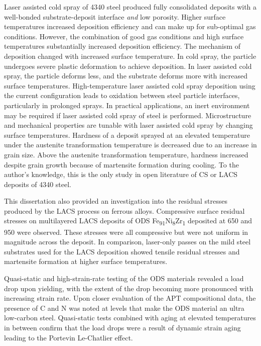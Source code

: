 		Laser assisted cold spray of 4340 steel produced fully consolidated deposits with a well-bonded substrate-deposit interface \textit{and} low porosity. Higher surface temperatures increased deposition efficiency and can make up for sub-optimal gas conditions. However, the combination of good gas conditions and high surface temperatures substantially increased deposition efficiency. The mechanism of deposition changed with increased surface temperature. In cold spray, the particle undergoes severe plastic deformation to achieve deposition. In laser assisted cold spray, the particle deforms less, and the substrate deforms more with increased surface temperatures. High-temperature laser assisted cold spray deposition using the current configuration leads to oxidation between steel particle interfaces, particularly in prolonged sprays. In practical applications, an inert environment may be required if laser assisted cold spray of steel is performed. Microstructure and mechanical properties are tunable with laser assisted cold spray by changing surface temperatures. Hardness of a deposit sprayed at an elevated temperature under the austenite transformation temperature is decreased due to an increase in grain size. Above the austenite transformation temperature, hardness increased despite grain growth because of martensite formation during cooling. To the author’s knowledge, this is the only study in open literature of CS or LACS deposits of 4340 steel.
		

		
	This dissertation also provided an investigation into the residual stresses produced by the LACS process on ferrous alloys. Compressive surface residual stresses on multilayered LACS deposits of ODS Fe\textsubscript{91}Ni\textsubscript{8}Zr\textsubscript{1} deposited at 650 \celsius{} and 950 \celsius{} were observed. These stresses were all compressive but were not uniform in magnitude across the deposit. In comparison, laser-only passes on the mild steel substrates used for the LACS deposition showed tensile residual stresses and martensite formation at higher surface temperatures.
	
	Quasi-static and high-strain-rate testing of the ODS materials revealed a load drop upon yielding, with the extent of the drop becoming more pronounced with increasing strain rate. Upon closer evaluation of the APT compositional data, the presence of C and N was noted at levels that make the ODS material an ultra low-carbon steel. Quasi-static tests combined with aging at elevated temperatures in between confirm that the load drops were a result of dynamic strain aging leading to the Portevin Le-Chatlier effect. 

